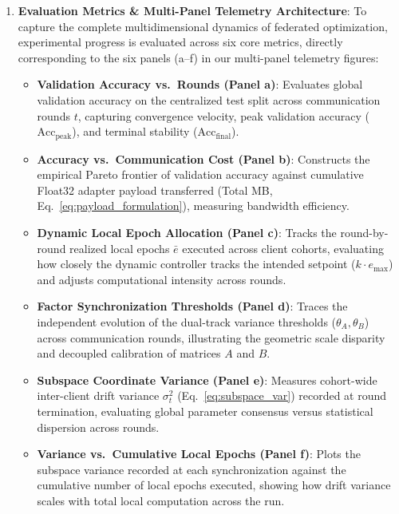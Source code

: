 \begin{enumerate}
    \item \textbf{Evaluation Metrics \& Multi-Panel Telemetry Architecture}\label{sec:eval_metrics}: 
    To capture the complete multidimensional dynamics of federated optimization, experimental progress is evaluated across six core metrics, directly corresponding to the six panels (a--f) in our multi-panel telemetry figures:
    \begin{itemize}
        \item \textbf{Validation Accuracy vs.\ Rounds (Panel a)}: Evaluates global validation accuracy on the centralized test split across communication rounds $t$, capturing convergence velocity, peak validation accuracy ($\text{Acc}_{\text{peak}}$), and terminal stability ($\text{Acc}_{\text{final}}$).
        \item \textbf{Accuracy vs.\ Communication Cost (Panel b)}: Constructs the empirical Pareto frontier of validation accuracy against cumulative Float32 adapter payload transferred (Total MB, Eq.~\ref{eq:payload_formulation}), measuring bandwidth efficiency.
        \item \textbf{Dynamic Local Epoch Allocation (Panel c)}: Tracks the round-by-round realized local epochs $\bar{e}$ executed across client cohorts, evaluating how closely the dynamic controller tracks the intended setpoint ($k \cdot e_{\max}$) and adjusts computational intensity across rounds.
        \item \textbf{Factor Synchronization Thresholds (Panel d)}: Traces the independent evolution of the dual-track variance thresholds ($\theta_A, \theta_B$) across communication rounds, illustrating the geometric scale disparity and decoupled calibration of matrices $A$ and $B$.
        \item \textbf{Subspace Coordinate Variance (Panel e)}: Measures cohort-wide inter-client drift variance $\sigma_t^2$ (Eq.~\ref{eq:subspace_var}) recorded at round termination, evaluating global parameter consensus versus statistical dispersion across rounds.
        \item \textbf{Variance vs.\ Cumulative Local Epochs (Panel f)}: Plots the subspace variance recorded at each synchronization against the cumulative number of local epochs executed, showing how drift variance scales with total local computation across the run.
    \end{itemize}
\end{enumerate}
